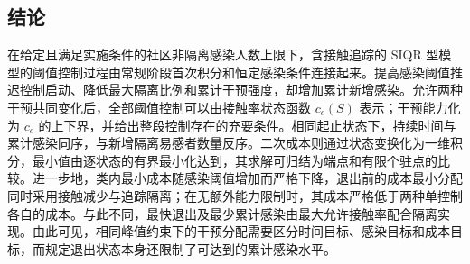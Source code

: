 \subsection{结论}
在给定且满足实施条件的社区非隔离感染人数上限下，含接触追踪的 SIQR 型模型的阈值控制过程由常规阶段首次积分和恒定感染条件连接起来。提高感染阈值推迟控制启动、降低最大隔离比例和累计干预强度，却增加累计新增感染。允许两种干预共同变化后，全部阈值控制可以由接触率状态函数 $c_c(S)$ 表示；干预能力化为 $c_c$ 的上下界，并给出整段控制存在的充要条件。相同起止状态下，持续时间与累计感染同序，与新增隔离易感者数量反序。二次成本则通过状态变换化为一维积分，最小值由逐状态的有界最小化达到，其求解可归结为端点和有限个驻点的比较。进一步地，类内最小成本随感染阈值增加而严格下降，退出前的成本最小分配同时采用接触减少与追踪隔离；在无额外能力限制时，其成本严格低于两种单控制各自的成本。与此不同，最快退出及最少累计感染由最大允许接触率配合隔离实现。由此可见，相同峰值约束下的干预分配需要区分时间目标、感染目标和成本目标，而规定退出状态本身还限制了可达到的累计感染水平。


\FloatBarrier

